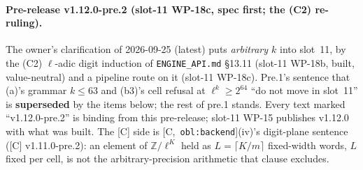 \documentclass[11pt]{article}
\theoremstyle{remark}
\newcommand{\Z}{\mathbb{Z}}
\newcommand{\HA}[1]{[C,~\texttt{#1}]}      %
\begin{document}
\paragraph{Pre-release v1.12.0-pre.2 (slot-11 WP-18c, spec first; the (C2) re-ruling).} The
owner's clarification of 2026-09-25 (latest) puts \emph{arbitrary $k$} into slot~11, by the (C2)
$\ell$-adic digit induction of \texttt{ENGINE\_API.md} \S13.11 (slot-11 WP-18b, built, value-neutral)
and a pipeline route on it (slot-11 WP-18c). Pre.1's sentence that (a)'s grammar $k\le63$ and (b3)'s
cell refusal at $\ell^k\ge2^{64}$ ``do not move in slot~11'' is \textbf{superseded} by the items
below; the rest of pre.1 stands. Every text marked ``v1.12.0-pre.2'' is binding from this
pre-release; slot-11 WP-15 publishes v1.12.0 with what was built. The [C] side is
\HA{obl:backend}(iv)'s digit-plane sentence ([C] v1.11.0-pre.2): an element of $\Z/\ell^{K}$ held
as $L=\lceil K/m\rceil$ fixed-width words, $L$ fixed per cell, is not the arbitrary-precision
arithmetic that clause excludes.
\end{document}
